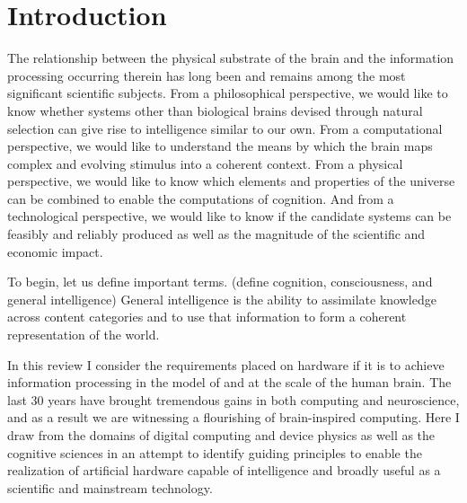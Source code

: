 \section{\label{sec:introduction}Introduction}
The relationship between the physical substrate of the brain and the information processing occurring therein has long been and remains among the most significant scientific subjects. From a philosophical perspective, we would like to know whether systems other than biological brains devised through natural selection can give rise to intelligence similar to our own. From a computational perspective, we would like to understand the means by which the brain maps complex and evolving stimulus into a coherent context. From a physical perspective, we would like to know which elements and properties of the universe can be combined to enable the computations of cognition. And from a technological perspective, we would like to know if the candidate systems can be feasibly and reliably produced as well as the magnitude of the scientific and economic impact.

To begin, let us define important terms. (define cognition, consciousness, and general intelligence)
General intelligence is the ability to assimilate knowledge across content categories and to use that information to form a coherent representation of the world.

In this review I consider the requirements placed on hardware if it is to achieve information processing in the model of and at the scale of the human brain. The last 30 years have brought tremendous gains in both computing and neuroscience, and as a result we are witnessing a flourishing of brain-inspired computing. Here I draw from the domains of digital computing and device physics as well as the cognitive sciences in an attempt to identify guiding principles to enable the realization of artificial hardware capable of intelligence and broadly useful as a scientific and mainstream technology.

